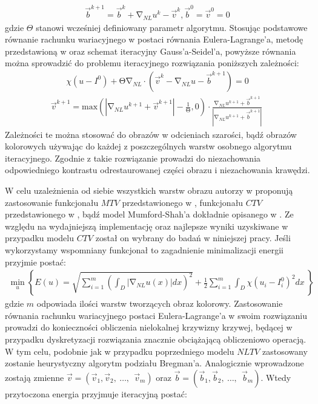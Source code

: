 \documentclass[12pt, twoside, openany]{report}
\theoremstyle{definition}
\begin{document}
\begin{align}
{\overrightarrow{b}}^{k+1}={\overrightarrow{b}}^k+{\mathrm{\nabla }}_{NL}u^k-{\overrightarrow{v}}^k, {\overrightarrow{b}}^0={\overrightarrow{v}}^0=0
\label{BREGMANVARIABLE}
\end{align}
gdzie $\Theta$ stanowi wcześniej definiowany parametr algorytmu. Stosując podstawowe równanie rachunku wariacyjnego w postaci równania Eulera-Lagrange’a, metodę przedstawioną w \cite{tai2011fast} oraz schemat iteracyjny Gauss’a-Seidel’a, powyższe równania można sprowadzić do problemu iteracyjnego rozwiązania poniższych zależności:
\begin{align}
\chi \left(u-I^0\right)+\mathrm{\Theta }{\mathrm{\nabla }}_{NL}\cdot \left({\overrightarrow{v}}^k-{\mathrm{\nabla }}_{NL}u-{\overrightarrow{b}}^{k+1}\right)=0
\label{ELNLTV1}
\end{align}
\begin{align}
{\overrightarrow{v}}^{k+1}\mathrm{=}{\mathrm{max} \left(\left|{\mathrm{\nabla }}_{NL}u^{k+1}+{\overrightarrow{v}}^{k+1}\right|-\frac{1}{\mathrm{\Theta }},0\right)\cdot\frac{{\mathrm{\nabla }}_{NL}u^{k+1}+{\overrightarrow{b}}^{k+1}}{\left|{\mathrm{\nabla }}_{NL}u^{k+1}+{\overrightarrow{b}}^{k+1}\right|}\ }
\label{ELNLTV2}
\end{align}
Zależności te można stosować do obrazów w odcieniach szarości, bądź obrazów kolorowych używając do  każdej z poszczególnych warstw osobnego algorytmu iteracyjnego. Zgodnie z \cite{duan2015fast} takie rozwiązanie prowadzi do niezachowania odpowiedniego kontrastu odrestaurowanej części obrazu i niezachowania krawędzi.
\par
W celu uzależnienia od siebie wszystkich warstw obrazu autorzy w \cite{duan2015fast} proponują zastosowanie funkcjonału $MTV$ przedstawionego w \cite{yang2009fast}, funkcjonału $CTV$ przedstawionego w \cite{blomgren1998color}, bądź model Mumford-Shah’a dokładnie opisanego w \cite{jung2011nonlocal}. Ze względu na wydajniejszą implementację oraz najlepsze wyniki uzyskiwane w przypadku modelu \textbf{$CTV$} został on wybrany do badań w niniejszej pracy. Jeśli wykorzystamy wspomniany funkcjonał to zagadnienie minimalizacji energii przyjmie postać:
\begin{align}
{\mathop{\mathrm{min}}_{u} \left\{E\left(u\right)=\sqrt{\sum^m_{i=1}{{\left(\int_D{\left|{\mathrm{\nabla }}_{NL}u(x)\right|}dx\right)}^2}}+\frac{1}{2}\sum^m_{i=1}{\int_D{\chi{\left(u_i-I^0_i\right)}^2}dx}\ \right\}\ }
\label{ENLCTV}
\end{align}
gdzie $m$ odpowiada ilości warstw tworzących obraz kolorowy. Zastosowanie równania rachunku wariacyjnego postaci Eulera-Lagrange’a w swoim rozwiązaniu prowadzi do konieczności obliczenia nielokalnej krzywizny krzywej, będącej w przypadku dyskretyzacji rozwiązania znacznie obciążającą obliczeniowo operacją. W tym celu, podobnie jak w przypadku poprzedniego modelu $NLTV$ zastosowany zostanie heurystyczny algorytm podziału Bregman’a. Analogicznie wprowadzone zostają zmienne $\overrightarrow{v}=\left({\overrightarrow{v}}_1,{\overrightarrow{v}}_2,\ \dots ,\ \ {\overrightarrow{v}}_m\right)$ oraz $\overrightarrow{b}=\left({\overrightarrow{b}}_1,{\overrightarrow{b}}_2,\ \dots ,\ \ {\overrightarrow{b}}_m\right)$. Wtedy przytoczona energia przyjmuje iteracyjną postać: 
\end{document}
